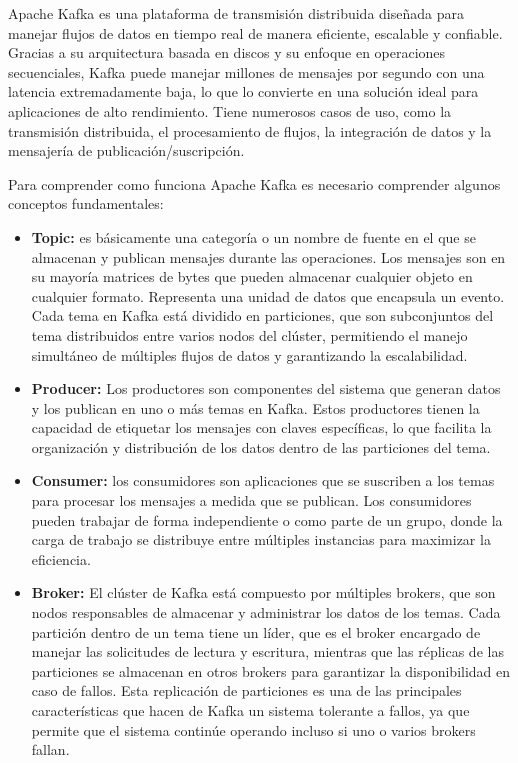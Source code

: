 \documentclass{article}
\begin{document}
Apache Kafka es una plataforma de transmisión distribuida diseñada para manejar flujos de datos en tiempo real de manera eficiente, escalable y confiable. Gracias a su arquitectura basada en discos y su enfoque en operaciones secuenciales, Kafka puede manejar millones de mensajes por segundo con una latencia extremadamente baja, lo que lo convierte en una solución ideal para aplicaciones de alto rendimiento.
Tiene numerosos casos de uso, como la transmisión distribuida, el procesamiento de flujos, la integración de datos y la mensajería de publicación/suscripción.

Para comprender como funciona Apache Kafka es necesario comprender algunos conceptos fundamentales:

\begin{itemize}
    \item \textbf{Topic: }es básicamente una categoría o un nombre de fuente en el que se almacenan y publican mensajes durante las operaciones. Los mensajes son en su mayoría matrices de bytes que pueden almacenar cualquier objeto en cualquier formato. Representa una unidad de datos que encapsula un evento. Cada tema en Kafka está dividido en particiones, que son subconjuntos del tema distribuidos entre varios nodos del clúster, permitiendo el manejo simultáneo de múltiples flujos de datos y garantizando la escalabilidad.
    \item \textbf{Producer: }Los productores son componentes del sistema que generan datos y los publican en uno o más temas en Kafka. Estos productores tienen la capacidad de etiquetar los mensajes con claves específicas, lo que facilita la organización y distribución de los datos dentro de las particiones del tema.
    \item \textbf{Consumer: } los consumidores son aplicaciones que se suscriben a los temas para procesar los mensajes a medida que se publican. Los consumidores pueden trabajar de forma independiente o como parte de un grupo, donde la carga de trabajo se distribuye entre múltiples instancias para maximizar la eficiencia.
    \item \textbf{Broker: }El clúster de Kafka está compuesto por múltiples brokers, que son nodos responsables de almacenar y administrar los datos de los temas. Cada partición dentro de un tema tiene un líder, que es el broker encargado de manejar las solicitudes de lectura y escritura, mientras que las réplicas de las particiones se almacenan en otros brokers para garantizar la disponibilidad en caso de fallos. Esta replicación de particiones es una de las principales características que hacen de Kafka un sistema tolerante a fallos, ya que permite que el sistema continúe operando incluso si uno o varios brokers fallan.

\end{itemize}
\end{document}
